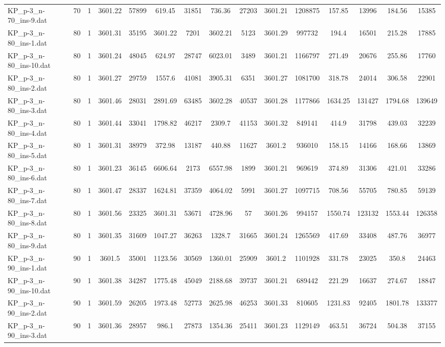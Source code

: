 \begin{table}[!ht]
{\begin{tabular}{lcccccccccccccc}
KP\_p-3\_n-70\_ins-9.dat & 70 & 1 & 3601.22 & 57899 & 619.45 & 31851 & 736.36 & 27203 & 3601.21 & 1208875 & 157.85 & 13996 & 184.56 & 15385 \\
KP\_p-3\_n-80\_ins-1.dat & 80 & 1 & 3601.31 & 35195 & 3601.22 & 7201 & 3602.21 & 5123 & 3601.29 & 997732 & 194.4 & 16501 & 215.28 & 17885 \\
KP\_p-3\_n-80\_ins-10.dat & 80 & 1 & 3601.24 & 48045 & 624.97 & 28747 & 6023.01 & 3489 & 3601.21 & 1166797 & 271.49 & 20676 & 255.86 & 17760 \\
KP\_p-3\_n-80\_ins-2.dat & 80 & 1 & 3601.27 & 29759 & 1557.6 & 41081 & 3905.31 & 6351 & 3601.27 & 1081700 & 318.78 & 24014 & 306.58 & 22901 \\
KP\_p-3\_n-80\_ins-3.dat & 80 & 1 & 3601.46 & 28031 & 2891.69 & 63485 & 3602.28 & 40537 & 3601.28 & 1177866 & 1634.25 & 131427 & 1794.68 & 139649 \\
KP\_p-3\_n-80\_ins-4.dat & 80 & 1 & 3601.44 & 33041 & 1798.82 & 46217 & 2309.7 & 41153 & 3601.32 & 849141 & 414.9 & 31798 & 439.03 & 32239 \\
KP\_p-3\_n-80\_ins-5.dat & 80 & 1 & 3601.31 & 38979 & 372.98 & 13187 & 440.88 & 11627 & 3601.2 & 936010 & 158.15 & 14166 & 168.66 & 13869 \\
KP\_p-3\_n-80\_ins-6.dat & 80 & 1 & 3601.23 & 36145 & 6606.64 & 2173 & 6557.98 & 1899 & 3601.21 & 969619 & 374.89 & 31306 & 421.01 & 33286 \\
KP\_p-3\_n-80\_ins-7.dat & 80 & 1 & 3601.47 & 28337 & 1624.81 & 37359 & 4064.02 & 5991 & 3601.27 & 1097715 & 708.56 & 55705 & 780.85 & 59139 \\
KP\_p-3\_n-80\_ins-8.dat & 80 & 1 & 3601.56 & 23325 & 3601.31 & 53671 & 4728.96 & 57 & 3601.26 & 994157 & 1550.74 & 123132 & 1553.44 & 126358 \\
KP\_p-3\_n-80\_ins-9.dat & 80 & 1 & 3601.35 & 31609 & 1047.27 & 36263 & 1328.7 & 31665 & 3601.24 & 1265569 & 417.69 & 33408 & 487.76 & 36977 \\
KP\_p-3\_n-90\_ins-1.dat & 90 & 1 & 3601.5 & 35001 & 1123.56 & 30569 & 1360.01 & 25909 & 3601.2 & 1101928 & 331.78 & 23025 & 350.8 & 24463 \\
KP\_p-3\_n-90\_ins-10.dat & 90 & 1 & 3601.38 & 34287 & 1775.48 & 45049 & 2188.68 & 39737 & 3601.21 & 689442 & 221.29 & 16637 & 274.67 & 18847 \\
KP\_p-3\_n-90\_ins-2.dat & 90 & 1 & 3601.59 & 26205 & 1973.48 & 52773 & 2625.98 & 46253 & 3601.33 & 810605 & 1231.83 & 92405 & 1801.78 & 133377 \\
KP\_p-3\_n-90\_ins-3.dat & 90 & 1 & 3601.36 & 28957 & 986.1 & 27873 & 1354.36 & 25411 & 3601.23 & 1129149 & 463.51 & 36724 & 504.38 & 37155 \\

\end{tabular}}
\end{table}
